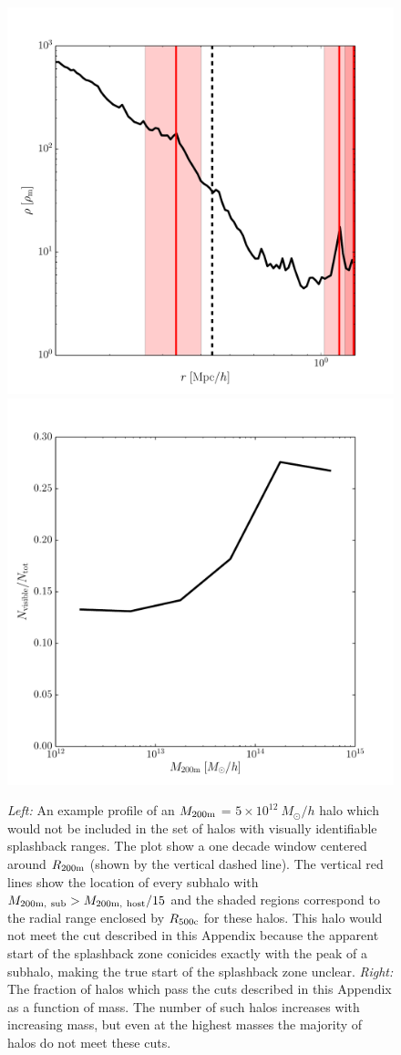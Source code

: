 \documentclass[numberedappendix,apj]{emulateapj}
\begin{document}
\begin{figure}
    \centering
     \includegraphics[width=0.4\columnwidth]{subhalo_contamination.pdf}
     \includegraphics[width=0.4\columnwidth]{vis_frac_m.pdf}
     \caption{\emph{Left:} An example profile of an $M_{\rm 200m}$ =
        $5 \times 10^{12}\ M_\odot/h$ halo which would
        not be included in the set of halos with visually identifiable
        splashback ranges. The plot show a one
        decade window centered around $R_{\rm 200m}$ (shown by the vertical
        dashed line). The vertical red lines show the location of every subhalo
        with $M_{\rm 200m,\ sub} > M_{\rm 200m,\ host} / 15$ and the shaded
        regions correspond to the radial range enclosed by $R_{\rm 500c}$ for
        these halos. This halo would not meet the cut described in this
        Appendix because the apparent start of the splashback zone conicides
        exactly with the peak of a subhalo, making the true start of the
        splashback zone unclear. \emph{Right:} The fraction of halos which pass
        the cuts described in this Appendix as a function of mass. The number
        of such halos increases with increasing mass, but even at the highest
        masses the majority of halos do not meet these cuts.}
     \label{fig:vis_figs}
\end{figure}
\end{document}
